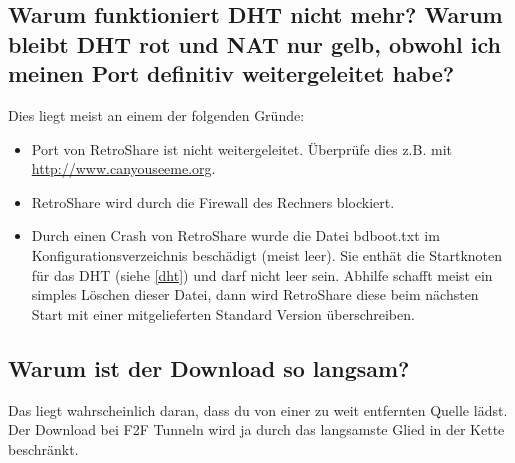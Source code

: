 {\subsection{Warum funktioniert DHT nicht mehr? Warum bleibt DHT rot und NAT nur gelb, obwohl ich meinen Port definitiv weitergeleitet habe?}
Dies liegt meist an einem der folgenden Gründe:
\begin{itemize}
\item Port von RetroShare ist nicht weitergeleitet. Überprüfe dies z.B. mit \url{http://www.canyouseeme.org}.
\item RetroShare wird durch die Firewall des Rechners blockiert.
\item Durch einen Crash von RetroShare wurde die Datei bdboot.txt im Konfigurationsverzeichnis beschädigt (meist leer). Sie enthät die Startknoten für das DHT (siehe \ref{dht}) und darf nicht leer sein. Abhilfe schafft meist ein simples Löschen dieser Datei, dann wird RetroShare diese beim nächsten Start mit einer mitgelieferten Standard Version überschreiben.
\end{itemize}

\subsection{Warum ist der Download so langsam?}
Das liegt wahrscheinlich daran, dass du von einer zu weit entfernten Quelle lädst. Der Download bei F2F Tunneln wird ja durch das langsamste Glied in der Kette beschränkt.
}

